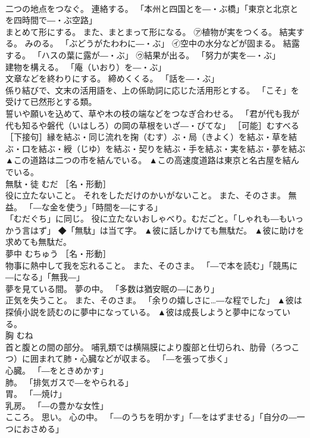 \documentclass[8pt]{extreport}
\begin{document}
\begin{CJK}{UTF8}{min}
\\	二つの地点をつなぐ。 連絡する。 「本州と四国とを―・ぶ橋」「東京と北京とを四時間で―・ぶ空路」 
\\	まとめて形にする。 また、まとまって形になる。 ㋐植物が実をつくる。 結実する。 みのる。 「ぶどうがたわわに―・ぶ」 ㋑空中の水分などが固まる。 結露する。 「ハスの葉に露が―・ぶ」 ㋒結果が出る。 「努力が実を―・ぶ」 
\\	建物を構える。 「庵（いおり）を―・ぶ」 
\\	文章などを終わりにする。 締めくくる。 「話を―・ぶ」 
\\	係り結びで、文末の活用語を、上の係助詞に応じた活用形とする。 「こそ」を受けて已然形とする類。 
\\	誓いや願いを込めて、草や木の枝の端などをつなぎ合わせる。 「君が代も我が代も知るや磐代（いはしろ）の岡の草根をいざ―・びてな」 ［可能］むすべる ［下接句］縁を結ぶ・同じ流れを掬（むす）ぶ・局（きよく）を結ぶ・草を結ぶ・口を結ぶ・綬（じゆ）を結ぶ・契りを結ぶ・手を結ぶ・実を結ぶ・夢を結ぶ	▲この道路は二つの市を結んでいる。 ▲この高速度道路は東京と名古屋を結んでいる。
\\	無駄・徒	むだ	［名・形動］ 
\\	役に立たないこと。 それをしただけのかいがないこと。 また、そのさま。 無益。 「―な金を使う」「時間を―にする」 
\\	「むだぐち」に同じ。 役に立たないおしゃべり。むだごと。「しゃれも―もいっかう言はず」 ◆「無駄」は当て字。	▲彼に話しかけても無駄だ。 ▲彼に助けを求めても無駄だ。
\\	夢中	むちゅう	［名・形動］ 
\\	物事に熱中して我を忘れること。 また、そのさま。 「―で本を読む」「競馬に―になる」「無我―」 
\\	夢を見ている間。 夢の中。 「多数は猶安眠の―にあり」 
\\	正気を失うこと。 また、そのさま。 「余りの嬉しさに…―な程でした」	▲彼は探偵小説を読むのに夢中になっている。 ▲彼は成長しようと夢中になっている。
\\	胸	むね	
\\	首と腹との間の部分。 哺乳類では横隔膜により腹部と仕切られ、肋骨（ろつこつ）に囲まれて肺・心臓などが収まる。 「―を張って歩く」 
\\	心臓。 「―をときめかす」 
\\	肺。 「排気ガスで―をやられる」 
\\	胃。 「―焼け」 
\\	乳房。 「―の豊かな女性」 
\\	こころ。 思い。 心の中。 「―のうちを明かす」「―をはずませる」「自分の―一つにおさめる」 

\end{CJK}
\end{document}
